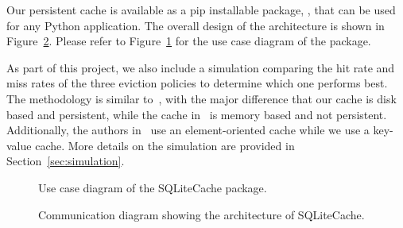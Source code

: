 Our persistent cache is available as a pip installable package,
\sqlitecache, that
can be used for any Python application.
The overall design of the architecture is shown in Figure~\ref{fig:architecture}.
Please refer to
Figure~\ref{fig:use_case_diagram} for the use case diagram of the package.

As part of this project, we also include a simulation 
comparing the hit rate
and miss rates of the three eviction policies to determine which
one performs best. The methodology is similar to~\cite{shah2023ImprovedCacheEviction},
with the major difference that our cache is disk based and persistent,
while the cache in~\cite{shah2023ImprovedCacheEviction} is memory based and not persistent.
Additionally, the authors in~\cite{shah2023ImprovedCacheEviction} use an element-oriented
cache while we use a key-value cache. More details on the simulation
are provided in Section~\ref{sec:simulation}.

\begin{figure}
    \caption{Use case diagram of the SQLiteCache package.}
    \label{fig:use_case_diagram}
\end{figure}

\begin{figure}[ht]
    \centering
    \caption{Communication diagram showing the architecture of SQLiteCache.}
    \label{fig:architecture}
\end{figure}

